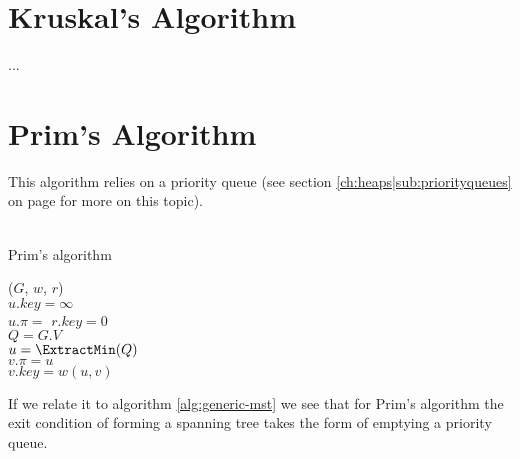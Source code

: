 \newpage
\section{Kruskal's Algorithm}
...


\section{Prim's Algorithm}
This algorithm relies on a priority queue (see section
\ref{ch:heaps|sub:priorityqueues} on page \pageref{ch:heaps|sub:priorityqueues}
for more on this topic).
\\\\
\begin{algorithm}[H]
	\caption{Prim's algorithm}
	\label{alg:prim-mst}
	
	
	
	
	
	\BlankLine
	\PrimMST($G$, $w$, $r$) \\
	\Begin
	{
		{
			$u.key = \infty$ \\
			$u.\pi = $ \Nil
		}
		$r.key = 0$ \\
		$Q = G.V$ \\
		
		{
			$u = \ExtractMin(Q)$ \\
			{
				{
					$v.\pi = u$ \\
					$v.key = w(u, v)$
				}
			}
		}
	}
\end{algorithm}
If we relate it to algorithm \ref{alg:generic-mst} we see that for Prim's
algorithm the exit condition of forming a spanning tree takes the form of
emptying a priority queue.

